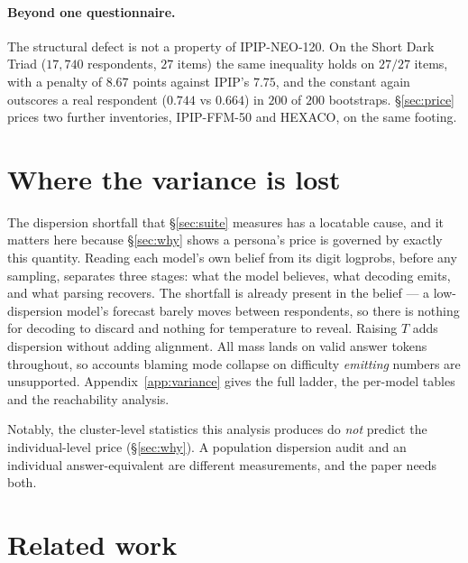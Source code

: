 \documentclass[11pt]{article}
\begin{document}
\paragraph{Beyond one questionnaire.} The structural defect is not a property of
IPIP-NEO-120. On the Short Dark Triad ($17{,}740$ respondents, $27$ items) the
same inequality holds on $27/27$ items, with a penalty of $8.67$ points against
IPIP's $7.75$, and the constant again outscores a real respondent ($0.744$ vs
$0.664$) in $200$ of $200$ bootstraps. \S\ref{sec:price} prices two further
inventories, IPIP-FFM-50 and HEXACO, on the same footing.

\section{Where the variance is lost}
\label{sec:mechanism}

The dispersion shortfall that \S\ref{sec:suite} measures has a locatable cause,
and it matters here because \S\ref{sec:why} shows a persona's price is governed
by exactly this quantity. Reading each model's own belief from its digit
logprobs, before any sampling, separates three stages: what the model believes,
what decoding emits, and what parsing recovers. The shortfall is already present
in the belief --- a low-dispersion model's forecast barely moves between
respondents, so there is nothing for decoding to discard and nothing for
temperature to reveal. Raising $T$ adds dispersion without adding alignment. All
mass lands on valid answer tokens throughout, so accounts blaming mode collapse
on difficulty \emph{emitting} numbers are unsupported. Appendix~\ref{app:variance}
gives the full ladder, the per-model tables and the reachability analysis.

Notably, the cluster-level statistics this analysis produces do \emph{not}
predict the individual-level price (\S\ref{sec:why}). A population dispersion
audit and an individual answer-equivalent are different measurements, and the
paper needs both.
\section{Related work}
\label{sec:related}
\end{document}
